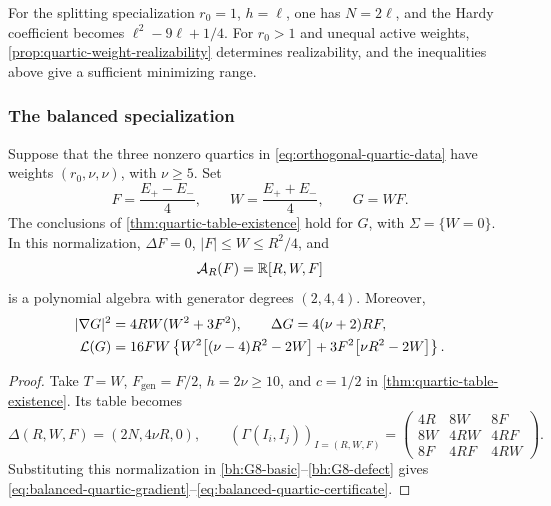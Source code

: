 For the splitting specialization $r_0=1$, $h=\ell$, one has
$N=2\ell$, and the Hardy coefficient becomes
$\ell^2-9\ell+1/4$. For $r_0>1$ and unequal active weights,
\cref{prop:quartic-weight-realizability} determines realizability,
and the inequalities above give a sufficient minimizing range.

\subsubsection{The balanced specialization}

\begin{corollary}
\label{prop:balanced-quartic-multiplier}
Suppose that the three nonzero quartics in
\eqref{eq:orthogonal-quartic-data} have weights $(r_0,\nu,\nu)$,
with $\nu\geq5$. Set
\[
 F=\frac{E_+-E_-}{4},\qquad W=\frac{E_++E_-}{4},\qquad G=WF.
\]
The conclusions of \cref{thm:quartic-table-existence} hold for $G$,
with $\Sigma=\{W=0\}$. In this normalization, $\Delta F=0$,
$|F|\leq W\leq R^2/4$, and
\begin{equation}\label{eq:balanced-quartic-smallest-algebra}
 \mathcal A_R(F)=\mathbb R[R,W,F]
\end{equation}
is a polynomial algebra with generator degrees $(2,4,4)$.
Moreover,
\begin{align}
 |\nabla G|^2&=4RW(W^2+3F^2),\qquad
 \Delta G=4(\nu+2)RF,\label{eq:balanced-quartic-gradient}\\
 \mathcal L(G)&=16FW\left\{
 W^2\big[(\nu-4)R^2-2W\big]
 +3F^2\big[\nu R^2-2W\big]\right\}.
 \label{eq:balanced-quartic-certificate}
\end{align}
\end{corollary}

\begin{proof}
Take $T=W$, $F_{\mathrm{gen}}=F/2$, $h=2\nu\geq10$, and $c=1/2$
in \cref{thm:quartic-table-existence}. Its table becomes
\begin{equation}\label{eq:balanced-quartic-table}
 \Delta(R,W,F)=(2N,4\nu R,0),\qquad
 (\Gamma(I_i,I_j))_{I=(R,W,F)}=
 \begin{pmatrix}
 4R&8W&8F\\
 8W&4RW&4RF\\
 8F&4RF&4RW
 \end{pmatrix}.
\end{equation}
Substituting this normalization in
\eqref{bh:G8-basic}--\eqref{bh:G8-defect} gives
\eqref{eq:balanced-quartic-gradient}--\eqref{eq:balanced-quartic-certificate}.
\end{proof}

